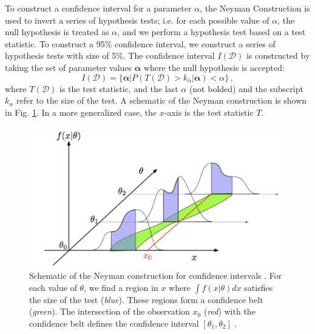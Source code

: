 To construct a confidence interval for a parameter $\alpha$, the Neyman Construction is used to invert a series of hypothesis tests; i.e. for each possible value of $\alpha$, the null hypothesis is treated as $\alpha$, and we perform a hypothesis test based on a test statistic. To construct a 95\% confidence interval, we construct a series of hypothesis tests with size of 5\%. The confidence interval $I(\mathcal{D})$ is constructed by taking the set of parameter values $\boldsymbol{\alpha}$ where the null hypothesis is accepted:
\begin{equation}
    I(\mathcal{D}) = \{ \boldsymbol{\alpha} | P(T(\mathcal{D}) > k_\alpha | \boldsymbol{\alpha}) < \alpha \} \, ,
\end{equation} 
where $T(\mathcal{D})$ is the test statistic, and the last $\alpha$ (not bolded) and the subscript $k_\alpha$ refer to the size of the test. A schematic of the Neyman construction is shown in Fig. \ref{fig:neyman-construction}. In a more generalized case, the $x$-axis is the test statistic $T$.

\begin{figure}[ht]
    \centering
    \includegraphics[width=15cm]{figures/ch-13-signal-extraction/schematic_neyman_construction.png}
    \caption[Schematic of the Neyman construction for confidence intervals.]{Schematic of the Neyman construction for confidence intervals \cite{2011-Statistics-Cranmer}. For each value of $\theta$, we find a region in $x$ where $\int f(x|\theta) dx$ satisfies the size of the test (\textit{blue}). These regions form a confidence belt (\textit{green}). The intersection of the observation $x_0$ (\textit{red}) with the confidence belt defines the confidence interval $[\theta_1, \theta_2]$ \cite{2011-Statistics-Cranmer}.} 
    \label{fig:neyman-construction}
\end{figure}

